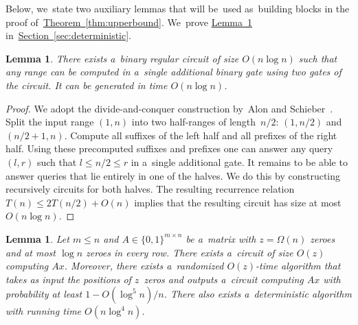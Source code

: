 \documentclass[11pt]{article}
\numberwithin{equation}{section}
\newtheorem{lemma}[theorem]{Lemma}
\theoremstyle{definition}
\theoremstyle{plain}
\newcommand{\expref}[2]{\hyperref[#2]{#1~\ref{#2}}}
\theoremstyle{plain}\newtheorem{observation}[theorem]{Observation}
\begin{document}
Below, we~state two auxiliary lemmas that will
be~used as~building blocks in the proof
of~\expref{Theorem}{thm:upperbound}.
We~prove \expref{Lemma}{lemma:permute}
in~\expref{Section}{sec:deterministic}.

\begin{lemma}\label{lemma:decompose}
There exists a~binary regular circuit of size $O(n\log n)$ such that
any range can be computed in a~single additional binary gate
using two gates of the circuit. It can be generated in time
$O(n\log n)$.
\end{lemma}

\begin{proof}%
	We adopt the divide-and-conquer construction by~Alon and
	Schieber~\cite{Alon87optimalpreprocessing}. Split the input range $(1,n)$ into
	two half-ranges of length~$n/2$:
	$(1,n/2)$ and $(n/2+1,n)$.
	Compute all suffixes of the left half and all prefixes of
	the right half.
	Using these precomputed suffixes and
	prefixes one can answer any query $(l,r)$ such that $l \le n/2
	\le r$ in a~single additional gate. It remains to be able to answer
	queries that lie entirely in one of the halves. We do this by
	constructing recursively circuits for both halves. The resulting
	recurrence relation $T(n) \le 2T(n/2)+O(n)$ implies that the
	resulting circuit has size at most $O(n\log n)$.
\end{proof}



\begin{lemma}\label{lemma:permute}
Let $m \le n$ and $A \in \{0,1\}^{m \times n}$
be a~matrix with $z=\Omega(n)$ zeroes and at most $\log n$ zeroes in every row.
There exists a~circuit of size $O(z)$ computing $Ax$. Moreover, there exists
a~randomized $O(z)$-time %
algorithm that takes as input the positions of
$z$~zeros and outputs a~circuit computing $Ax$ with probability at least
$1-O(\log^5n)/n$. There also exists a~deterministic algorithm with
running time $O(n\log^4n)$.
\end{lemma}
\end{document}

